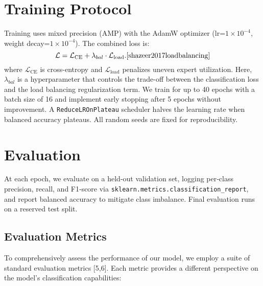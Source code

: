 \section{Training Protocol}
Training uses mixed precision (AMP) with the AdamW optimizer (lr=$1\times10^{-4}$, weight decay=$1\times10^{-4}$). The combined loss is:
\begin{equation}
\mathcal{L} = \mathcal{L}_{\mathrm{CE}} + \lambda_{bal} \cdot \mathcal{L}_{\mathrm{load}}. \cite{shazeer2017loadbalancing}
\end{equation}
where $\mathcal{L}_{\mathrm{CE}}$ is cross-entropy and $\mathcal{L}_{\mathrm{load}}$ penalizes uneven expert utilization. Here, $\lambda_{bal}$ is a hyperparameter that controls the trade-off between the classification loss and the load balancing regularization term. We train for up to 40 epochs with a batch size of 16 and implement early stopping after 5 epochs without improvement. A \texttt{ReduceLROnPlateau} scheduler halves the learning rate when balanced accuracy plateaus. All random seeds are fixed for reproducibility.

\section{Evaluation}
At each epoch, we evaluate on a held‑out validation set, logging per‑class precision, recall, and F1‑score via \texttt{sklearn.metrics.classification\_report}, and report balanced accuracy to mitigate class imbalance. Final evaluation runs on a reserved test split.

\subsection*{Evaluation Metrics}
To comprehensively assess the performance of our model, we employ a suite of standard evaluation metrics [5,6]. Each metric provides a different perspective on the model's classification capabilities:

